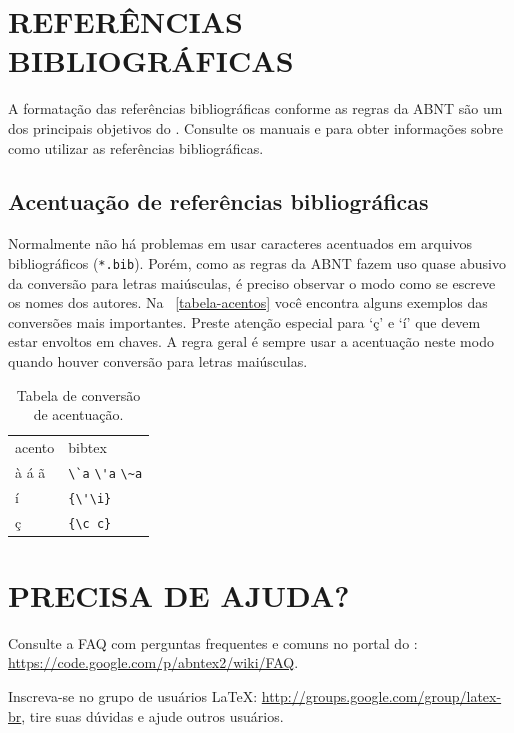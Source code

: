 \section{\uppercase{Referências bibliográficas}}

A formatação das referências bibliográficas conforme as regras da ABNT são um
dos principais objetivos do \abnTeX. Consulte os manuais
 e  para obter informações
sobre como utilizar as referências bibliográficas.

\subsection{Acentuação de referências bibliográficas}

Normalmente não há problemas em usar caracteres acentuados em arquivos
bibliográficos (\texttt{*.bib}). Porém, como as regras da ABNT fazem uso quase
abusivo da conversão para letras maiúsculas, é preciso observar o modo como se
escreve os nomes dos autores. Na ~\autoref{tabela-acentos} você encontra alguns
exemplos das conversões mais importantes. Preste atenção especial para `ç' e `í'
que devem estar envoltos em chaves. A regra geral é sempre usar a acentuação
neste modo quando houver conversão para letras maiúsculas.

\begin{table}[htbp]
\caption{Tabela de conversão de acentuação.}
\label{tabela-acentos}

\begin{center}
\begin{tabular}{ll}\hline\hline
acento & \textsf{bibtex}\\
à á ã & \verb+\`a+ \verb+\'a+ \verb+\~a+\\
í & \verb+{\'\i}+\\
ç & \verb+{\c c}+\\
\hline\hline
\end{tabular}
\end{center}
\end{table}


\section{\uppercase{Precisa de ajuda?}}

Consulte a FAQ com perguntas frequentes e comuns no portal do \abnTeX:
\url{https://code.google.com/p/abntex2/wiki/FAQ}.

Inscreva-se no grupo de usuários \LaTeX:
\url{http://groups.google.com/group/latex-br}, tire suas dúvidas e ajude
outros usuários.

